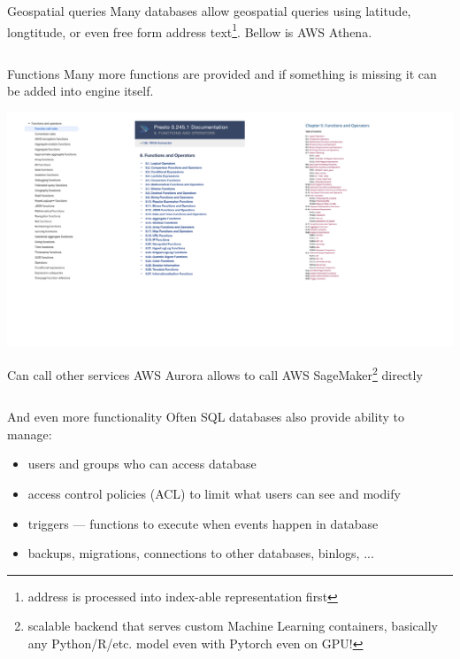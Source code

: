 \documentclass[t,pdf]{beamer}
\begin{document}
\begin{frame}{Geospatial queries}
Many databases allow geospatial queries using latitude, longtitude, or even free form address text\footnote{address is processed into index-able representation first}. Bellow is AWS Athena.

\begin{mdframed}[style=codeframe]\inputminted{sql}{athena-geo.sql}\end{mdframed}
\end{frame}

\begin{frame}{Functions}
Many more functions are provided and if something is missing it can be added into engine itself.

\includegraphics[height=.7\textheight]{udfs_all}
\end{frame}

\begin{frame}{Can call other services}
AWS Aurora allows to call AWS SageMaker\footnote{scalable backend that serves custom Machine Learning containers, basically any Python/R/etc. model even with Pytorch even on GPU!} directly

\begin{mdframed}[style=codeframe]\inputminted{sql}{aws-aurora-sagemaker.sql}\end{mdframed}
\end{frame}

\begin{frame}{And even more functionality}
Often SQL databases also provide ability to manage:

\begin{itemize}
    \item users and groups who can access database
    \item access control policies (ACL) to limit what users can see and modify
    \item triggers — functions to execute when events happen in database
    \item backups, migrations, connections to other databases, binlogs, ...
\end{itemize}
\end{frame}
\end{document}
